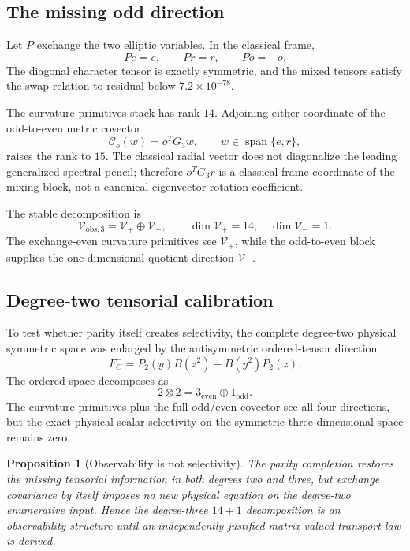 \documentclass[11pt]{article}
\newtheorem{proposition}[theorem]{Proposition}
\theoremstyle{definition}
\theoremstyle{remark}
\newcommand{\cC}{\mathcal{C}}
\newcommand{\cV}{\mathcal{V}}
\newcommand{\Span}{\operatorname{span}}
\begin{document}
\subsection{The missing odd direction}

Let $P$ exchange the two elliptic variables.  In the classical frame,
\[
Pe=e,
\qquad
Pr=r,
\qquad
Po=-o.
\]
The diagonal character tensor is exactly symmetric, and the mixed tensors satisfy the swap relation to residual below $7.2\times10^{-78}$.

The curvature-primitives stack has rank $14$.  Adjoining either coordinate of the odd-to-even metric covector
\begin{equation}\label{eq:oddblock}
\cC_o(w)=o^TG_3w,
\qquad w\in\Span\{e,r\},
\end{equation}
raises the rank to $15$.  The classical radial vector does not diagonalize the leading generalized spectral pencil; therefore $o^TG_3r$ is a classical-frame coordinate of the mixing block, not a canonical eigenvector-rotation coefficient.

The stable decomposition is
\begin{equation}\label{eq:14plus1}
\cV_{\mathrm{obs},3}=\cV_+\oplus\cV_-,
\qquad
\dim\cV_+=14,
\quad
\dim\cV_-=1.
\end{equation}
The exchange-even curvature primitives see $\cV_+$, while the odd-to-even block supplies the one-dimensional quotient direction $\cV_-$.

\subsection{Degree-two tensorial calibration}

To test whether parity itself creates selectivity, the complete degree-two physical symmetric space was enlarged by the antisymmetric ordered-tensor direction
\begin{equation}\label{eq:FCminus}
F_C^-=P_2(y)B(z^2)-B(y^2)P_2(z).
\end{equation}
The ordered space decomposes as
\[
2\otimes2=3_{\mathrm{even}}\oplus1_{\mathrm{odd}}.
\]
The curvature primitives plus the full odd/even covector see all four directions, but the exact physical scalar selectivity on the symmetric three-dimensional space remains zero.

\begin{proposition}[Observability is not selectivity]\label{prop:obsnotselect}
The parity completion restores the missing tensorial information in both degrees two and three, but exchange covariance by itself imposes no new physical equation on the degree-two enumerative input.  Hence the degree-three $14+1$ decomposition is an observability structure until an independently justified matrix-valued transport law is derived.
\end{proposition}
\end{document}
